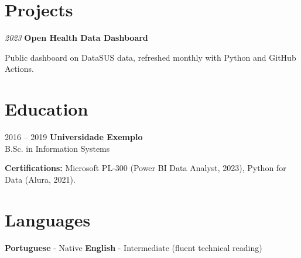     \section{Projects}
        \begin{twocolentry}{
            \textit{2023}
        }
            \textbf{Open Health Data Dashboard}
        \end{twocolentry}
        \vspace{0.10cm}
        \begin{onecolentry}
            \begin{highlights}
                \item Public dashboard on DataSUS data, refreshed monthly with Python and GitHub Actions.
            \end{highlights}
        \end{onecolentry}

    \section{Education}
        \begin{twocolentry}{2016 -- 2019}
            \textbf{Universidade Exemplo} \\
            B.Sc. in Information Systems
        \end{twocolentry}

        \vspace{0.12cm}

        \begin{onecolentry}
            \textbf{Certifications:} Microsoft PL-300 (Power BI Data Analyst, 2023), Python for Data (Alura, 2021).
        \end{onecolentry}

    \section{Languages}
        \begin{onecolentry}
            \textbf{Portuguese} - Native \quad\textbar\quad \textbf{English} - Intermediate (fluent technical reading)
        \end{onecolentry}

